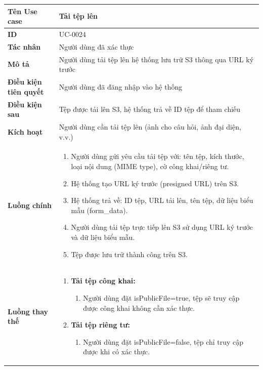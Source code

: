 {
\renewcommand{\arraystretch}{1.5}

\begin{tabularx}{\textwidth}{|>{\raggedright\arraybackslash}X|>{\raggedright\arraybackslash}X|}
\hline
\textbf{Tên Use case} & Tải tệp lên \\
\hline
\textbf{ID} & UC-0024 \\
\hline
\textbf{Tác nhân} & Người dùng đã xác thực \\
\hline
\textbf{Mô tả} & Người dùng tải tệp lên hệ thống lưu trữ S3 thông qua URL ký trước \\
\hline
\textbf{Điều kiện tiên quyết} & Người dùng đã đăng nhập vào hệ thống \\
\hline
\textbf{Điều kiện sau} & Tệp được tải lên S3, hệ thống trả về ID tệp để tham chiếu \\
\hline
\textbf{Kích hoạt} & Người dùng cần tải tệp lên (ảnh cho câu hỏi, ảnh đại diện, v.v.) \\
\hline
\textbf{Luồng chính} &
\begin{enumerate}
    \item Người dùng gửi yêu cầu tải tệp với: tên tệp, kích thước, loại nội dung (MIME type), cờ công khai/riêng tư.
    \item Hệ thống tạo URL ký trước (presigned URL) trên S3.
    \item Hệ thống trả về: ID tệp, URL tải lên, tên tệp, dữ liệu biểu mẫu (form\_data).
    \item Người dùng tải tệp trực tiếp lên S3 sử dụng URL ký trước và dữ liệu biểu mẫu.
    \item Tệp được lưu trữ thành công trên S3.
\end{enumerate} \\
\hline
\textbf{Luồng thay thế} &
\begin{enumerate}
    \item \textbf{Tải tệp công khai:}
    \begin{enumerate}
        \item[1A.] Người dùng đặt isPublicFile=true, tệp sẽ truy cập được công khai không cần xác thực.
    \end{enumerate}
    \item \textbf{Tải tệp riêng tư:}
    \begin{enumerate}
        \item[1B.] Người dùng đặt isPublicFile=false, tệp chỉ truy cập được khi có xác thực.
    \end{enumerate}
\end{enumerate} \\

\end{tabularx}}
